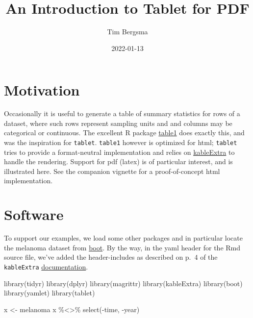 \documentclass[
]{article}
\title{An Introduction to Tablet for PDF}
\author{Tim Bergsma}
\date{2022-01-13}
\newenvironment{Shaded}{\begin{snugshade}}{\end{snugshade}}
\newcommand{\FunctionTok}[1]{\textcolor[rgb]{0.00,0.00,0.00}{#1}}
\newcommand{\NormalTok}[1]{#1}
\newcommand{\OtherTok}[1]{\textcolor[rgb]{0.56,0.35,0.01}{#1}}
\newcommand{\SpecialCharTok}[1]{\textcolor[rgb]{0.00,0.00,0.00}{#1}}
\begin{document}
\maketitle

{
\hypersetup{linkcolor=}
\setcounter{tocdepth}{2}
\tableofcontents
}
\hypertarget{motivation}{%
\section{Motivation}\label{motivation}}

Occasionally it is useful to generate a table of summary statistics for
rows of a dataset, where such rows represent sampling units and and
columns may be categorical or continuous. The excellent R package
\href{https://CRAN.R-project.org/package=table1}{table1} does exactly
this, and was the inspiration for \texttt{tablet}. \texttt{table1}
however is optimized for html; \texttt{tablet} tries to provide a
format-neutral implementation and relies on
\href{https://CRAN.R-project.org/package=kableExtra}{kableExtra} to
handle the rendering. Support for pdf (latex) is of particular interest,
and is illustrated here. See the companion vignette for a
proof-of-concept html implementation.

\hypertarget{software}{%
\section{Software}\label{software}}

To support our examples, we load some other packages and in particular
locate the melanoma dataset from
\href{https://CRAN.R-project.org/package=boot}{boot}. By the way, in the
yaml header for the Rmd source file, we've added the header-includes as
described on p.~4 of the \texttt{kableExtra}
\href{https://haozhu233.github.io/kableExtra/awesome_table_in_pdf.pdf}{documentation}.

\begin{Shaded}
\begin{Highlighting}[]
\FunctionTok{library}\NormalTok{(tidyr)}
\FunctionTok{library}\NormalTok{(dplyr)}
\FunctionTok{library}\NormalTok{(magrittr)}
\FunctionTok{library}\NormalTok{(kableExtra)}
\FunctionTok{library}\NormalTok{(boot)}
\FunctionTok{library}\NormalTok{(yamlet)}
\FunctionTok{library}\NormalTok{(tablet)}
\end{Highlighting}
\end{Shaded}

\begin{Shaded}
\begin{Highlighting}[]
\NormalTok{x }\OtherTok{\textless{}{-}}\NormalTok{ melanoma}
\NormalTok{x }\SpecialCharTok{\%\textless{}\textgreater{}\%} \FunctionTok{select}\NormalTok{(}\SpecialCharTok{{-}}\NormalTok{time, }\SpecialCharTok{{-}}\NormalTok{year)}
\end{Highlighting}
\end{Shaded}
\end{document}
